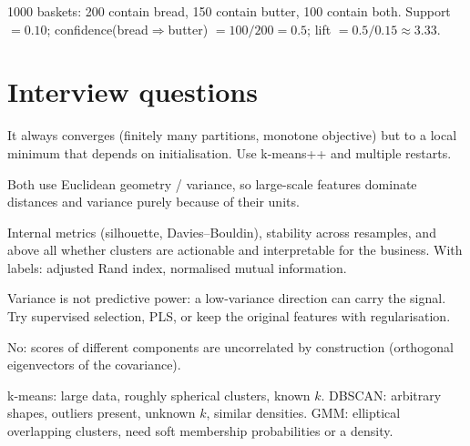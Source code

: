 \begin{example}
1000 baskets: 200 contain bread, 150 contain butter, 100 contain both. Support $=0.10$; confidence(bread$\Rightarrow$butter) $=100/200=0.5$; lift $=0.5/0.15\approx3.33$.
\end{example}

\section{Interview questions}
\A It always converges (finitely many partitions, monotone objective) but to a local minimum that depends on initialisation. Use k-means++ and multiple restarts.

\A Both use Euclidean geometry / variance, so large-scale features dominate distances and variance purely because of their units.

\A Internal metrics (silhouette, Davies--Bouldin), stability across resamples, and above all whether clusters are actionable and interpretable for the business. With labels: adjusted Rand index, normalised mutual information.

\A Variance is not predictive power: a low-variance direction can carry the signal. Try supervised selection, PLS, or keep the original features with regularisation.

\A No: scores of different components are uncorrelated by construction (orthogonal eigenvectors of the covariance).

\A k-means: large data, roughly spherical clusters, known $k$. DBSCAN: arbitrary shapes, outliers present, unknown $k$, similar densities. GMM: elliptical overlapping clusters, need soft membership probabilities or a density.
